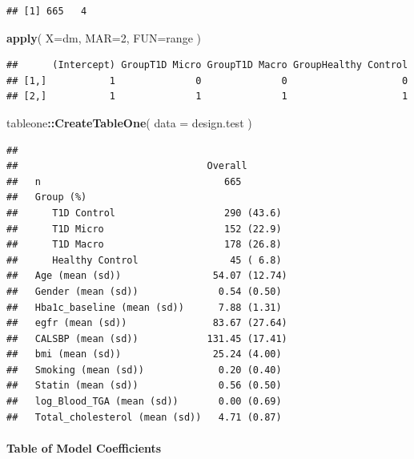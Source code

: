 \documentclass[]{article}
\newenvironment{Shaded}{\begin{snugshade}}{\end{snugshade}}
\newcommand{\DataTypeTok}[1]{\textcolor[rgb]{0.13,0.29,0.53}{#1}}
\newcommand{\DecValTok}[1]{\textcolor[rgb]{0.00,0.00,0.81}{#1}}
\newcommand{\KeywordTok}[1]{\textcolor[rgb]{0.13,0.29,0.53}{\textbf{#1}}}
\newcommand{\NormalTok}[1]{#1}
\newcommand{\OperatorTok}[1]{\textcolor[rgb]{0.81,0.36,0.00}{\textbf{#1}}}
\let\oldparagraph\paragraph
\renewcommand{\paragraph}[1]{\oldparagraph{#1}\mbox{}}
\begin{document}
\begin{verbatim}
## [1] 665   4
\end{verbatim}

\begin{Shaded}
\begin{Highlighting}[]
\KeywordTok{apply}\NormalTok{( }\DataTypeTok{X=}\NormalTok{dm, }\DataTypeTok{MAR=}\DecValTok{2}\NormalTok{, }\DataTypeTok{FUN=}\NormalTok{range )}
\end{Highlighting}
\end{Shaded}

\begin{verbatim}
##      (Intercept) GroupT1D Micro GroupT1D Macro GroupHealthy Control
## [1,]           1              0              0                    0
## [2,]           1              1              1                    1
\end{verbatim}

\begin{Shaded}
\begin{Highlighting}[]
\NormalTok{tableone}\OperatorTok{::}\KeywordTok{CreateTableOne}\NormalTok{( }\DataTypeTok{data =}\NormalTok{ design.test )}
\end{Highlighting}
\end{Shaded}

\begin{verbatim}
##                                
##                                 Overall       
##   n                                665        
##   Group (%)                                   
##      T1D Control                   290 (43.6) 
##      T1D Micro                     152 (22.9) 
##      T1D Macro                     178 (26.8) 
##      Healthy Control                45 ( 6.8) 
##   Age (mean (sd))                54.07 (12.74)
##   Gender (mean (sd))              0.54 (0.50) 
##   Hba1c_baseline (mean (sd))      7.88 (1.31) 
##   egfr (mean (sd))               83.67 (27.64)
##   CALSBP (mean (sd))            131.45 (17.41)
##   bmi (mean (sd))                25.24 (4.00) 
##   Smoking (mean (sd))             0.20 (0.40) 
##   Statin (mean (sd))              0.56 (0.50) 
##   log_Blood_TGA (mean (sd))       0.00 (0.69) 
##   Total_cholesterol (mean (sd))   4.71 (0.87)
\end{verbatim}

\newpage

\hypertarget{table-of-model-coefficients}{%
\paragraph{Table of Model
Coefficients}\label{table-of-model-coefficients}}
\end{document}
